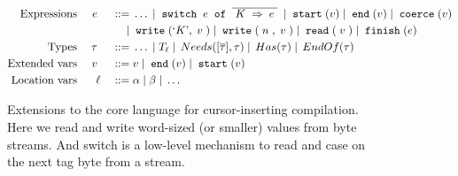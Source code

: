 
\begin{figure}
  \vspace{-5mm}
  \begin{displaymath}
    \begin{aligned}
      \textup{Expressions} && \; {e} \; && 
     \; ::= \; & \ldots \; | \; \; \texttt{switch} \;{}\; e\; \; \texttt{of} \;\; \overline{{\; {K} \;} \Rightarrow {\; {e} \;}} \; 
     \; | \; \; \texttt{start} \;(v) \; | \; \; \texttt{end} \;(v) \; | \; \; \texttt{coerce} \;(v)
     \\     
     && && \; | \; & \; \texttt{write} \;(`K\textrm',\; v \;)
           \; | \; \; \texttt{write} \;(\; n \;,\; v \;)
           \; | \; \; \texttt{read} \;(\; v \;) \; | \; 
      \; \texttt{finish} \;(e) \\      
      \textup{Types} && \; {\tau} \; && \; ::= \; & \ldots 
               \; | \; T_{\ell}
               \; | \; \, Needs([\overline{\tau}],\tau) \; | \; \, Has(\tau) 
               \; | \; \, EndOf(\tau) \\
      \textup{Extended vars} && \; v \; && \; ::= \; & 
           v \; | \; \; \texttt{end} \;(v) 
                \; | \; \; \texttt{start} \;(v) \\
      \textup{Location vars} && \ell && \; ::= \; & \alpha \; | \; \beta \; | \; \ldots \\
    \end{aligned}
  \end{displaymath}
  \vspace{-4mm}
  \caption{Extensions to the core language for cursor-inserting compilation.
    Here we read and write word-sized (or smaller) values from byte streams. And
    switch is a low-level mechanism to read and case on the next tag byte from a
    stream.}
  \label{fig:target}
\end{figure}
